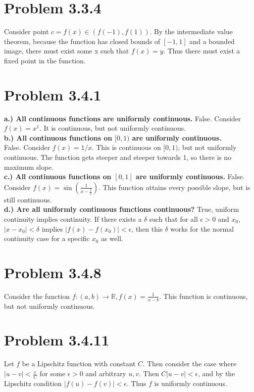 \documentclass[10pt]{article} %
\begin{document}
\section{Problem 3.3.4}
Consider point $c = f(x) \in \left(f(-1),f(1)\right)$. By the intermediate value theorem, because the function has closed bounds of $[-1,1]$ and a bounded image, there must exist some x such that $f(x) = y$. Thus there must exist a fixed point in the function.\\

\section{Problem 3.4.1}
\textbf{a.) All continuous functions are uniformly continuous.}
False. Consider $f(x) = x^1$. It is continuous, but not uniformly continuous.\\

\textbf{b.) All continuous functions on $[0,1)$ are uniformly continuous.}\\
False. Consider $f(x) = 1/x$. This is continuous on $[0,1)$, but not uniformly continuous. The function gets steeper and steeper towards 1, so there is no maximum slope.\\

\textbf{c.) All continuous functions on $[0,1]$ are uniformly continuous.}
False. Consider $f(x) = \sin(\frac{1}{x-\frac12})$. This function attains every possible slope, but is still continuous.\\

\textbf{d.) Are all uniformly continuous functions continuous?}
True, uniform continuity implies continuity. If there exists a $\delta$ such that for all $\epsilon>0$ and $x_0$, $|x-x_0|<\delta$ implies $|f(x)-f(x_0)|<\epsilon$, then this $\delta$ works for the normal continuity case for a specific $x_0$ as well.\\

\section{Problem 3.4.8}
Consider the function $f:(a,b)\rightarrow\mathbb{R}, f(x) = \frac{1}{x-b}$. This function is continuous, but not uniformly continuous.\\

\section{Problem 3.4.11}
Let $f$ be a Lipschitz function with constant $C$. Then consider the case where $|u-v|<\frac{\epsilon}{C}$ for some $\epsilon>0$ and arbitrary $u,v$. Then $C|u-v|<\epsilon$, and by the Lipschitz condition $|f(u)-f(v)|<\epsilon$. Thus $f$ is uniformly continuous.\\
\end{document}

